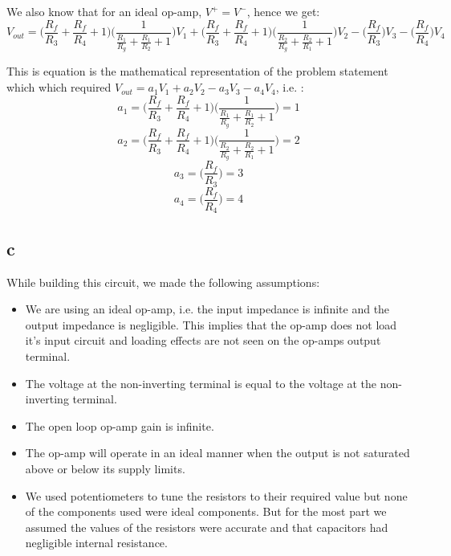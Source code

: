 \documentclass{article}
\theoremstyle{plain}
\theoremstyle{definition}
\theoremstyle{remark}
\begin{document}
We also know that for an ideal op-amp, $V^+ = V^-$, hence we get:
$$ V_{out} = \Big( \frac{R_f}{R_3} + \frac{ R_f}{R_4} + 1\Big) \Big( \frac{1}{\frac{R_1}{R_g} + \frac{R_1}{R_2} + 1}\Big) V_1 + \Big( \frac{R_f}{R_3} + \frac{ R_f}{R_4} + 1\Big) \Big( \frac{1}{\frac{R_2}{R_g} + \frac{R_2}{R_1} + 1} \Big) V_2 - \Big( \frac{R_f}{R_3}\Big)V_3 - \Big( \frac{ R_f}{R_4}\Big)V_4$$

This is equation is the mathematical representation of the problem statement which which required $V_{out} = a_1V_1 + a_2 V_2 - a_3 V_3 - a_4 V_4$, i.e. :
$$a_1 =  \Big( \frac{R_f}{R_3} + \frac{ R_f}{R_4} + 1\Big) \Big( \frac{1}{\frac{R_1}{R_g} + \frac{R_1}{R_2} + 1}\Big) = 1$$
$$a_2 =  \Big( \frac{R_f}{R_3} + \frac{ R_f}{R_4} + 1\Big) \Big( \frac{1}{\frac{R_2}{R_g} + \frac{R_2}{R_1} + 1} \Big) = 2$$
$$a_3 = \Big( \frac{R_f}{R_3}\Big) = 3$$
$$a_4 = \Big( \frac{ R_f}{R_4}\Big) = 4$$


\subsection*{c}
While building this circuit, we made the following assumptions:
\begin{itemize}
\item We are using an ideal op-amp, i.e. the input impedance is infinite and the output impedance is negligible. This implies that the op-amp does not load it's input circuit and loading effects are not seen on the op-amps output terminal.

\item The voltage at the non-inverting terminal is equal to the voltage at the non-inverting terminal.

\item The open loop op-amp gain is infinite.

\item The op-amp will operate in an ideal manner when the output is not saturated above or below its supply limits.

\item We used potentiometers to tune the resistors to their required value but none of the components used were ideal components. But for the most part we assumed the values of the resistors were accurate and that capacitors had negligible internal resistance.

\end{itemize}
\end{document}
